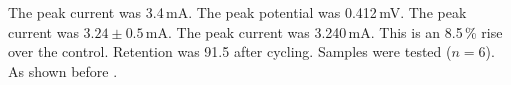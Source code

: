 The peak current was 3.4\,mA.
The peak potential was 0.412\,mV.
The peak current was $3.24 \pm 0.5$\,mA.
The peak current was 3.240\,mA.
This is an 8.5\,\% rise over the control.
Retention was 91.5 after cycling.
Samples were tested ($n = 6$).
As shown before \cite{jones1999}.
